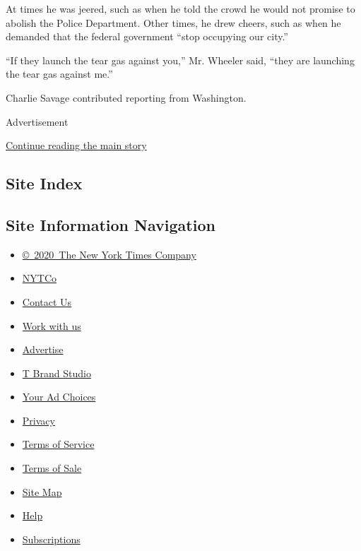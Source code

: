 At times he was jeered, such as when he told the crowd he would not
promise to abolish the Police Department. Other times, he drew cheers,
such as when he demanded that the federal government ``stop occupying
our city.''

``If they launch the tear gas against you,'' Mr. Wheeler said, ``they
are launching the tear gas against me.''

Charlie Savage contributed reporting from Washington.

Advertisement

\protect\hyperlink{after-bottom}{Continue reading the main story}

\hypertarget{site-index}{%
\subsection{Site Index}\label{site-index}}

\hypertarget{site-information-navigation}{%
\subsection{Site Information
Navigation}\label{site-information-navigation}}

\begin{itemize}
\tightlist
\item
  \href{https://help.nytimes3xbfgragh.onion/hc/en-us/articles/115014792127-Copyright-notice}{©~2020~The
  New York Times Company}
\end{itemize}

\begin{itemize}
\tightlist
\item
  \href{https://www.nytco.com/}{NYTCo}
\item
  \href{https://help.nytimes3xbfgragh.onion/hc/en-us/articles/115015385887-Contact-Us}{Contact
  Us}
\item
  \href{https://www.nytco.com/careers/}{Work with us}
\item
  \href{https://nytmediakit.com/}{Advertise}
\item
  \href{http://www.tbrandstudio.com/}{T Brand Studio}
\item
  \href{https://www.nytimes3xbfgragh.onion/privacy/cookie-policy\#how-do-i-manage-trackers}{Your
  Ad Choices}
\item
  \href{https://www.nytimes3xbfgragh.onion/privacy}{Privacy}
\item
  \href{https://help.nytimes3xbfgragh.onion/hc/en-us/articles/115014893428-Terms-of-service}{Terms
  of Service}
\item
  \href{https://help.nytimes3xbfgragh.onion/hc/en-us/articles/115014893968-Terms-of-sale}{Terms
  of Sale}
\item
  \href{https://spiderbites.nytimes3xbfgragh.onion}{Site Map}
\item
  \href{https://help.nytimes3xbfgragh.onion/hc/en-us}{Help}
\item
  \href{https://www.nytimes3xbfgragh.onion/subscription?campaignId=37WXW}{Subscriptions}
\end{itemize}
